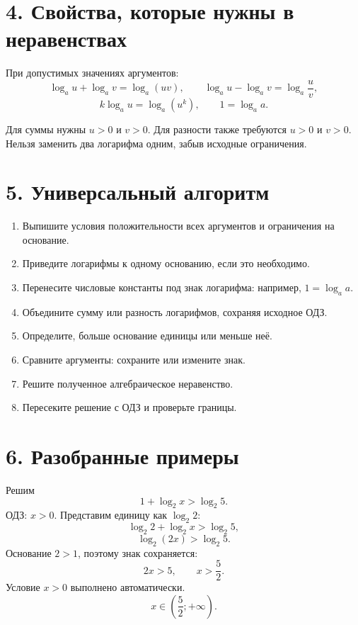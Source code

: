 \documentclass[a4paper,12pt]{article}
\begin{document}
\section*{4. Свойства, которые нужны в неравенствах}
При допустимых значениях аргументов:
\[
\log_a u+\log_a v=\log_a(uv),
\qquad
\log_a u-\log_a v=\log_a\frac{u}{v},
\]
\[
k\log_a u=\log_a(u^k),
\qquad
1=\log_a a.
\]

\begin{warnbox}
Для суммы нужны $u>0$ и $v>0$. Для разности также требуются $u>0$ и $v>0$.
Нельзя заменить два логарифма одним, забыв исходные ограничения.
\end{warnbox}

\section*{5. Универсальный алгоритм}
\begin{enumerate}
\item Выпишите условия положительности всех аргументов и ограничения на основание.
\item Приведите логарифмы к одному основанию, если это необходимо.
\item Перенесите числовые константы под знак логарифма: например, $1=\log_a a$.
\item Объедините сумму или разность логарифмов, сохраняя исходное ОДЗ.
\item Определите, больше основание единицы или меньше неё.
\item Сравните аргументы: сохраните или измените знак.
\item Решите полученное алгебраическое неравенство.
\item Пересеките решение с ОДЗ и проверьте границы.
\end{enumerate}

\section*{6. Разобранные примеры}

\begin{examplebox}
Решим
\[
1+\log_2 x>\log_2 5.
\]
ОДЗ: $x>0$. Представим единицу как $\log_2 2$:
\[
\log_2 2+\log_2 x>\log_2 5,
\]
\[
\log_2(2x)>\log_2 5.
\]
Основание $2>1$, поэтому знак сохраняется:
\[
2x>5,\qquad x>\frac52.
\]
Условие $x>0$ выполнено автоматически.
\[
\boxed{x\in\left(\frac52;+\infty\right)}.
\]
\end{examplebox}
\end{document}

